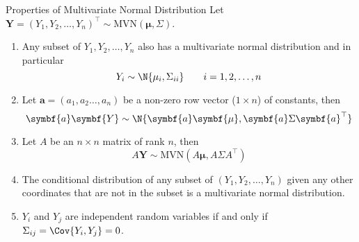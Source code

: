 \begin{Theorem}{Properties of Multivariate Normal Distribution}{}
    Let $ \symbf{Y}
        =(Y_1,Y_2,\ldots,Y_n)^\top \sim \text{MVN}(\symbf{\mu},\Sigma) $.
    \begin{enumerate}[label=(\arabic*)]
        \item Any subset of $ Y_1,Y_2,\ldots,Y_n $
              also has a multivariate normal distribution and in particular
              \[ Y_i \sim \N{\mu_i,\Sigma_{ii}}\qquad i=1,2,\ldots,n \]
        \item Let $ \symbf{a}=(a_1,a_2\ldots,a_n) $ be a
              non-zero row vector ($ 1\times n $) of constants, then
              \[ \symbf{a}\symbf{Y}\sim
                  \N{\symbf{a}\symbf{\mu},\symbf{a}
                      \Sigma\symbf{a}^\top} \]
        \item Let $ A $ be an $ n\times n $ matrix of rank $ n $, then
              \[ A\symbf{Y} \sim \text{MVN}(A\symbf{\mu},A\Sigma A^\top) \]
        \item The conditional distribution of any
              subset of $ (Y_1,Y_2,\ldots,Y_n) $ given any other coordinates
              that are not in the subset
              is a multivariate normal distribution.
        \item $ Y_i $ and $ Y_j $ are independent
              random variables if and only if $ \Sigma_{ij}=\Cov{Y_i,Y_j}=0 $.
    \end{enumerate}
\end{Theorem}
